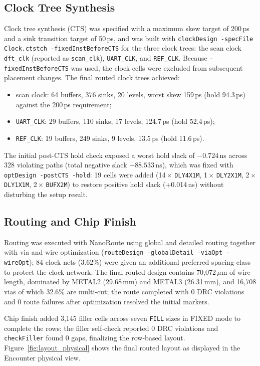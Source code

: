 \documentclass[11pt,a4paper]{article}
\begin{document}
\subsection{Clock Tree Synthesis}
Clock tree synthesis (CTS) was specified with a maximum skew target of 200\,ps and a sink transition target of 50\,ps, and was built with \texttt{clockDesign -specFile Clock.ctstch -fixedInstBeforeCTS} for the three clock trees: the scan clock \texttt{dft\_clk} (reported as \texttt{scan\_clk}), \texttt{UART\_CLK}, and \texttt{REF\_CLK}. Because \texttt{-fixedInstBeforeCTS} was used, the clock cells were excluded from subsequent placement changes. The final routed clock trees achieved:
\begin{itemize}
    \item scan clock: 64 buffers, 376 sinks, 20 levels, worst skew 159\,ps (hold 94.3\,ps) against the 200\,ps requirement;
    \item \texttt{UART\_CLK}: 29 buffers, 110 sinks, 17 levels, 124.7\,ps (hold 52.4\,ps);
    \item \texttt{REF\_CLK}: 19 buffers, 249 sinks, 9 levels, 13.5\,ps (hold 11.6\,ps).
\end{itemize}
The initial post-CTS hold check exposed a worst hold slack of $-0.724$\,ns across 328 violating paths (total negative slack $-88.533$\,ns), which was fixed with \texttt{optDesign -postCTS -hold}: 19 cells were added (14\,$\times$ \texttt{DLY4X1M}, 1\,$\times$ \texttt{DLY2X1M}, 2\,$\times$ \texttt{DLY1X1M}, 2\,$\times$ \texttt{BUFX2M}) to restore positive hold slack (+0.014\,ns) without disturbing the setup result.

\subsection{Routing and Chip Finish}
Routing was executed with NanoRoute using global and detailed routing together with via and wire optimization (\texttt{routeDesign -globalDetail -viaOpt -wireOpt}); 84 clock nets (3.62\%) were given an additional preferred spacing class to protect the clock network. The final routed design contains 70,072\,$\mu$m of wire length, dominated by METAL2 (29.68\,mm) and METAL3 (26.31\,mm), and 16,708 vias of which 32.6\% are multi-cut; the route completed with 0 DRC violations and 0 route failures after optimization resolved the initial markers.

Chip finish added 3,145 filler cells across seven \texttt{FILL} sizes in FIXED mode to complete the rows; the filler self-check reported 0 DRC violations and \texttt{checkFiller} found 0 gaps, finalizing the row-based layout. Figure~\ref{fig:layout_physical} shows the final routed layout as displayed in the Encounter physical view.
\end{document}
